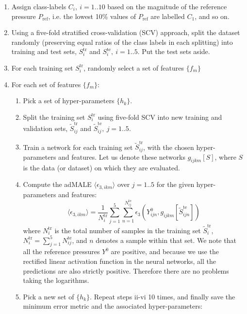 \documentclass[%
 preprint,
 superscriptaddress,
 amsmath,amssymb,
longbibliography,
]{revtex4-2}
\newcommand{\avg}[1]{\langle #1 \rangle}
\begin{document}
\begin{enumerate}
    \item Assign class-labels $C_i,\ i=1..10$ based on the magnitude of the reference pressure $P_\textrm{ref}$, i.e. the lowest 10\% values of $P_\textrm{ref}$ are labelled $C_1$, and so on.
    \item Using a five-fold stratified cross-validation (SCV) approach, split the dataset randomly (preserving equal ratios of the class labels in each splitting) into training and test sets, $S^\textrm{tr}_i$ and  $S^\textrm{te}_i,\ i=1..5$. Put the test sets aside.
    \item For each training set $S^\textrm{tr}_i$, randomly select a set of features $\{f_m\}$
    \item For each set of features $\{f_m\}$:
    \begin{enumerate}[i]
        \item Pick a set of hyper-parameters $\{h_k\}$.
        \item Split the training set $S^\textrm{tr}_i$ using five-fold SCV into new training and validation sets, $\tilde{S}^\textrm{tr}_{ij}$ and  $\tilde{S}^\textrm{te}_{ij},\ j=1..5$.
        \item Train a network for each training set $\tilde{S}^\textrm{tr}_{ij}$, with the chosen hyper-parameters and features. Let us denote these networks $g_{ijkm}[S]$, where $S$ is the data (or dataset) on which they are evaluated.
        \item Compute the adMALE $\avg{\epsilon_{3,ikm}}$ over $j=1..5$ for the given hyper-parameters and features:
 \begin{equation}\label{eq:adjALE_ikm}
      \avg{\epsilon_{3,ikm}} = \frac{1}{N^\textrm{tr}_{i}}\sum_{j=1}^5\sum_{n=1}^{N^\textrm{te}_{ij}} \epsilon_3(Y^0_{ijn}, g_{ijkm}[\tilde{S}^\textrm{te}_{ijn}])
 \end{equation}
        where $N^\textrm{tr}_{i}$ is the total number of samples in the training set $\tilde{S}^\textrm{tr}_{i}$, $N^\textrm{tr}_{i}=\sum_{j=1}^5 N^\textrm{te}_{ij}$, and $n$ denotes a sample within that set.
        We note that all the reference pressures $Y^0$ are positive, and because we use the rectified linear activation function in the neural networks, all the predictions are also strictly positive. Therefore there are no problems taking the logarithms.
        \item Pick a new set of $\{h_k\}$. Repeat steps ii-vi 10 times, and finally save the minimum error metric and the associated hyper-parameters:
        \begin{equation}\label{eq:M0ik}

\end{equation}
\end{enumerate}
\end{enumerate}
\end{document}
